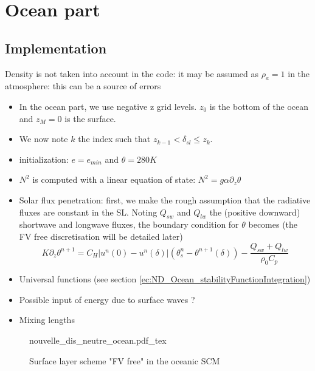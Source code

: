 \section{Ocean part}
\subsection{Implementation}
{\color{red} Density is not taken into account in the code:
it may be assumed as $\rho_a=1$ in the atmosphere: this can be
a source of errors}
\begin{itemize}
\item
In the ocean part, we use negative z grid levels.
$z_0$ is the bottom of the ocean and $z_{M}=0$ is the surface.
\item
We now note $k$ the index such that $z_{k-1} < \delta_{sl} \leq z_k$.
\item initialization: $e=e_{min}$ and $\theta = 280K$
\item $N^2$ is computed with a linear equation of state:
	$N^2 = g \alpha \partial_z \theta$
\item Solar flux penetration: first, we make the rough assumption that
	the radiative fluxes are constant in the SL.
	Noting $Q_{sw}$ and $Q_{lw}$ the (positive downward)
	shortwave and longwave fluxes, the boundary condition for
		$\theta$ becomes (the FV free discretisation will be
		detailed later)
	\begin{equation}
		K \partial_z \theta^{n+1} = C_H |u^n(0) - u^n(\delta)|
		(\theta^n_s - \theta^{n+1}(\delta)) - \frac{
			Q_{sw} + Q_{lw} }{\rho_0 C_p}
	\end{equation}
\item Universal functions (see section
	\ref{ec:ND_Ocean_stabilityFunctionIntegration})
\item Possible input of energy due to surface waves ?
\item Mixing lengths

\end{itemize}
\begin{figure}
	{nouvelle_dis_neutre_ocean.pdf_tex}
	\caption{Surface layer scheme "FV free" in the oceanic SCM}
	\label{fig:ND_Ocean_nouvelle_dis_neutre}
\end{figure}

